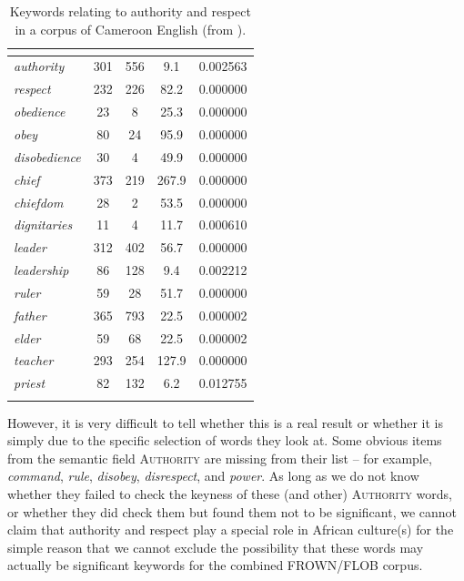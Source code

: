 \begin{table}
\caption{Keywords relating to authority and respect in a corpus of Cameroon English (from \citealt[421]{wolf_fixed_2007}).}
\label{tab:cameroonkey}
\begin{tabular}[t]{l *{2}{S[table-format=4]} S S[table-format=1.4]}
\lsptoprule
{} &  &  &  &  \\
\midrule
\textit{authority} & 301 & 556 & 9.1 & 0.002563 \\
\textit{respect} & 232 & 226 & 82.2 & 0.000000 \\
\textit{obedience} & 23 & 8 & 25.3 & 0.000000 \\
\textit{obey} & 80 & 24 & 95.9 & 0.000000 \\
\textit{disobedience} & 30 & 4 & 49.9 & 0.000000 \\
\textit{chief} & 373 & 219 & 267.9 & 0.000000 \\
\textit{chiefdom} & 28 & 2 & 53.5 & 0.000000 \\
\textit{dignitaries} & 11 & 4 & 11.7 & 0.000610 \\
\textit{leader} & 312 & 402 & 56.7 & 0.000000 \\
\textit{leadership} & 86 & 128 & 9.4 & 0.002212 \\
\textit{ruler} & 59 & 28 & 51.7 & 0.000000 \\
\textit{father} & 365 & 793 & 22.5 & 0.000002 \\
\textit{elder} & 59 & 68 & 22.5 & 0.000002 \\
\textit{teacher} & 293 & 254 & 127.9 & 0.000000 \\
\textit{priest} & 82 & 132 & 6.2 & 0.012755 \\
\lspbottomrule
\end{tabular}
\end{table}

However, it is very difficult to tell whether this is a real result or whether it is simply due to the specific selection of words they look at. Some obvious items from the semantic  field \textsc{Authority} are missing from their list -- for example, \textit{command}, \textit{rule}, \textit{disobey}, \textit{disrespect}, and \textit{power}. As long as we do not know whether they failed to check the keyness  of these (and other) \textsc{Authority} words, or whether they did check them but found them not to be significant, we cannot claim that authority and respect play a special role in African  culture(s)  for the simple reason that we cannot exclude the possibility that these words may actually be significant keywords  for the combined FROWN\slash FLOB  corpus.


